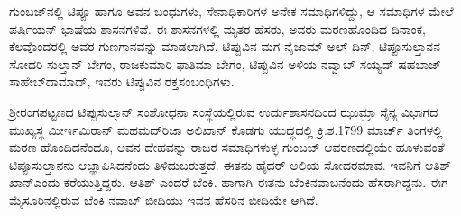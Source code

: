ಗುಂಬಜ್​ನಲ್ಲಿ ಟಿಪ್ಪೂ ಹಾಗೂ ಅವನ ಬಂಧುಗಳು, ಸೇನಾಧಿಕಾರಿಗಳ ಅನೇಕ ಸಮಾಧಿಗಳಿದ್ದು, ಆ ಸಮಾಧಿಗಳ ಮೇಲೆ ಪರ್ಷಿಯನ್​ ಭಾಷೆಯ ಶಾಸನಗಳಿವೆ. ಈ ಶಾಸನಗಳಲ್ಲಿ ಮೃತರ ಹೆಸರು, ಅವರು ಮರಣಹೊಂದಿದ ದಿನಾಂಕ, ಕೆಲವೊಂದರಲ್ಲಿ ಅವರ ಗುಣಗಾನವನ್ನು ಮಾಡಲಾಗಿದೆ. ಟಿಪ್ಪುವಿನ ಮಗ ನೈಜಾಮ್ ಅಲ್​ ದಿನ್​, ಟಿಪ್ಪೂಸುಲ್ತಾನನ ಸೋದರಿ ಸುಲ್ತಾನ್​ ಬೇಗಂ, ರಾಜಕುಮಾರಿ ಫಾತಿಮಾ ಬೇಗಂ, ಟಿಪ್ಪುವಿನ ಅಳಿಯ ನವ್ವಾಬ್​ ಸಯ್ಯದ್​ ಷಹಬಾಜ್​ ಸಾಹೇಬ್​ ದಾಮಾದ್​, ಇವರು ಟಿಪ್ಪುವಿನ ರಕ್ತಸಂಬಂಧಿಗಳು.

ಶ‍್ರೀರಂಗಪಟ್ಟಣದ ಟಿಪ್ಪುಸುಲ್ತಾನ್​ ಸಂಶೋಧನಾ ಸಂಸ್ಥೆಯಲ್ಲಿರುವ ಉರ್ದುಶಾಸನದಿಂದ ಝುಮ್ರಾ ಸೈನ್ಯ ವಿಭಾಗದ ಮುಖ್ಯಸ್ಥ ಮೀರ್ಇ\enginline{-}ಮಿರಾನ್​ ಮಹಮದ್​ರಿಜಾ ಅಲಿಖಾನ್​ ಕೊಡಗು ಯುದ್ಧದಲ್ಲಿ ಕ್ರಿ.ಶ.1799 ಮಾರ್ಚ್ ತಿಂಗಳಲ್ಲಿ ಮರಣ ಹೊಂದಿದನೆಂದೂ, ಅವನ ದೇಹವನ್ನು ರಾಜರ ಸಮಾಧಿಗಳುಳ್ಳ ಗುಂಬಜ್​ ಆವರಣದಲ್ಲಿಯೇ ಹೂಳುವಂತೆ ಟಿಪ್ಪೂಸುಲ್ತಾನನು ಆಜ್ಞಾಪಿಸಿದನೆಂದು ತಿಳಿದುಬರುತ್ತದೆ. ಈತನು ಹೈದರ್​ ಅಲಿಯ ಸೋದರಮಾವ. ಇವನಿಗೆ ಆತಿಶ್​ಖಾನ್​ ಎಂದು ಕರೆಯುತ್ತಿದ್ದರು. ಆತಿಶ್​ ಎಂದರೆ ಬೆಂಕಿ. ಹಾಗಾಗಿ ಈತನು ಬೆಂಕಿನವಾಬನೆಂದು ಹೆಸರಾಗಿದ್ದನು. ಈಗ ಮೈಸೂರಿನಲ್ಲಿರುವ ಬೆಂಕಿ ನವಾಬ್​ ಬೀದಿಯು ಇವನ ಹೆಸರಿನ ಬೀದಿಯೇ ಆಗಿದೆ.

